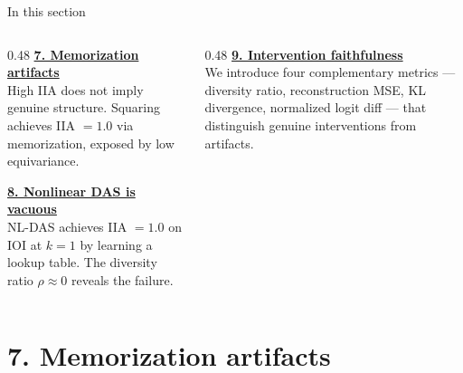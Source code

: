 \documentclass[aspectratio=169,11pt]{beamer}
\begin{document}
\begin{frame}{In this section}
\begin{columns}[T]
\begin{column}{0.48\textwidth}
\textbf{\hyperlink{sec7}{7. Memorization artifacts}}\\[0.2em]
{\small High IIA does not imply genuine structure. Squaring achieves IIA $= 1.0$ via memorization, exposed by low equivariance.}

\vspace{0.6em}
\textbf{\hyperlink{sec8}{8. Nonlinear DAS is vacuous}}\\[0.2em]
{\small NL-DAS achieves IIA $= 1.0$ on IOI at $k{=}1$ by learning a lookup table. The diversity ratio $\rho \approx 0$ reveals the failure.}
\end{column}
\begin{column}{0.48\textwidth}
\textbf{\hyperlink{sec9}{9. Intervention faithfulness}}\\[0.2em]
{\small We introduce four complementary metrics --- diversity ratio, reconstruction MSE, KL divergence, normalized logit diff --- that distinguish genuine interventions from artifacts.}
\end{column}
\end{columns}
\end{frame}

\hypertarget{sec7}{}
\section{7. Memorization artifacts}
\end{document}
